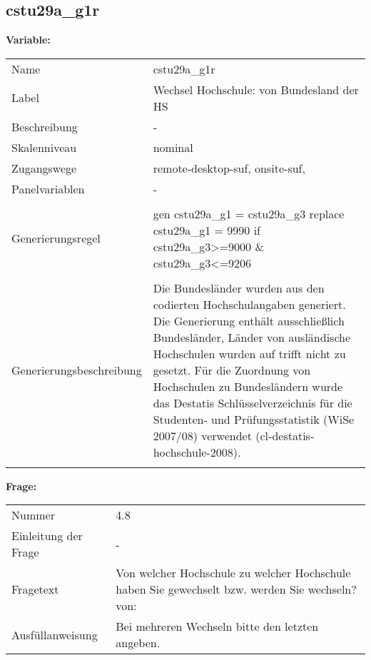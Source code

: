 	
	
	\subsection{cstu29a\_g1r}
	\label{subSection:cstu29a_g1r}

	\noindent\textbf{Variable:}\\
		\begin{tabular}{lL{11.3cm}}
			\label{tableVariable:cstu29a_g1r}
			Name & cstu29a\_g1r \\
			Label & Wechsel Hochschule: von Bundesland der HS \\
			Beschreibung & - \\
			Skalenniveau & nominal \\
			Zugangswege &
				remote-desktop-suf,
				onsite-suf,
 \\
			Panelvariablen & -
			 \\
			 \\
					Generierungsregel & gen cstu29a\_g1 = cstu29a\_g3
replace cstu29a\_g1  = 9990 if cstu29a\_g3\textgreater{}=9000 \& cstu29a\_g3\textless{}=9206 \\
				 \\
					Generierungsbeschreibung & Die Bundesländer wurden aus den codierten Hochschulangaben generiert. Die Generierung enthält ausschließlich Bundesländer, Länder von ausländische Hochschulen wurden auf trifft nicht zu gesetzt. Für die Zuordnung von Hochschulen zu Bundesländern wurde das Destatis Schlüsselverzeichnis für die Studenten- und Prüfungsstatistik (WiSe 2007/08) verwendet (cl-destatis-hochschule-2008).
				 \\	
			 \\
		\end{tabular}

		\vspace*{1 cm}
		\noindent\textbf{Frage:}\\
		\begin{tabular}{lL{11.3cm}}
			\label{tableQuestion:cstu29a_g1r}
			Nummer & 4.8 \\
			Einleitung der Frage & - \\
			Fragetext & Von welcher Hochschule zu welcher Hochschule haben Sie gewechselt bzw. werden Sie wechseln?
von: \\
			Ausfüllanweisung & Bei mehreren Wechseln bitte den letzten angeben. \\
		\end{tabular}





